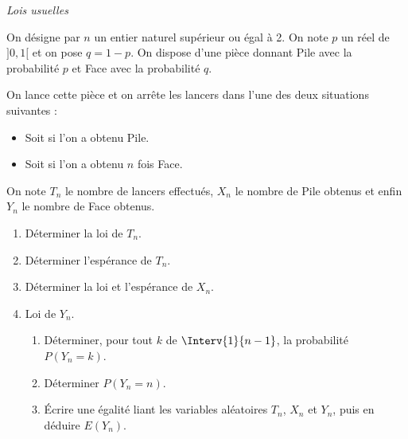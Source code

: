 \documentclass[a4paper,10pt]{report}
\begin{document}
\medskip

\begin{center}
\textit{{ {\large Lois usuelles}}}
\end{center}

\medskip

\begin{Exa} On désigne par $n$ un entier naturel supérieur ou égal à 2. On note $p$ un réel de $]0,1[$ et on pose $q = 1-p$. On dispose d'une pièce donnant Pile avec la probabilité $p$ et Face avec la probabilité $q$.

\noindent On lance cette pièce et on arrête les lancers dans l'une des deux situations suivantes :
\begin{itemize}
 \item Soit si l'on a obtenu Pile.
 \item Soit si l'on a obtenu $n$ fois Face.
\end{itemize}
%

\noindent On note $T_n$ le nombre de lancers effectués, $X_n$ le nombre de Pile obtenus et enfin $Y_n$ le nombre de Face obtenus. 
\begin{enumerate}
 \item  Déterminer la loi de $T_n$.
 \item  Déterminer l'espérance de $T_n$.
 \item Déterminer la loi et l'espérance de $X_n$.
 \item Loi de $Y_n$.
 \begin{enumerate}
  \item Déterminer, pour tout $k$ de $\Interv{1}{n-1}$, la probabilité $P(Y_n = k)$.
  \item Déterminer $P(Y_n = n)$.
  \item Écrire une égalité liant les variables aléatoires $T_n$, $X_n$ et $Y_n$, puis en déduire $E(Y_n)$.
\end{enumerate}
\end{enumerate}
\end{Exa}
\end{document}
